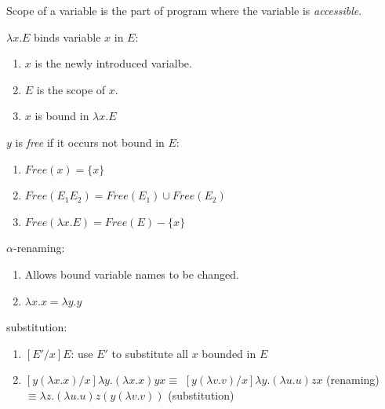 Scope of a variable is the part of program where the variable is \textit{accessible}.

$\lambda x. E$ binds variable $x$ in $E$:
\begin{enumerate}
    \item $x$ is the newly introduced varialbe.
    \item $E$ is the scope of $x$.
    \item $x$ is bound in $\lambda x. E$
\end{enumerate}

$y$ is \textit{free} if it occurs not bound in $E$:
\begin{enumerate}
    \item $Free(x) = \{x\}$
    \item $Free(E_1 E_2) = Free(E_1) \cup Free(E_2)$ 
    \item $Free(\lambda x. E) = Free(E) - \{x\}$
\end{enumerate}

$\alpha$-renaming:
\begin{enumerate}
    \item Allows bound variable names to be changed.
    \item $\lambda x. x = \lambda y. y$
\end{enumerate}

substitution:
\begin{enumerate}
    \item $[E'/x]E$: use $E'$ to substitute all $x$ bounded in $E$
    \item $[y (\lambda x. x)/x] \lambda y. (\lambda x. x) y x
           \equiv$
           $[y (\lambda v. v)/x] \lambda y. (\lambda u. u) z x $ (renaming)
           $\equiv \lambda z. (\lambda u. u) z (y (\lambda v. v))$ (substitution) 
\end{enumerate}























